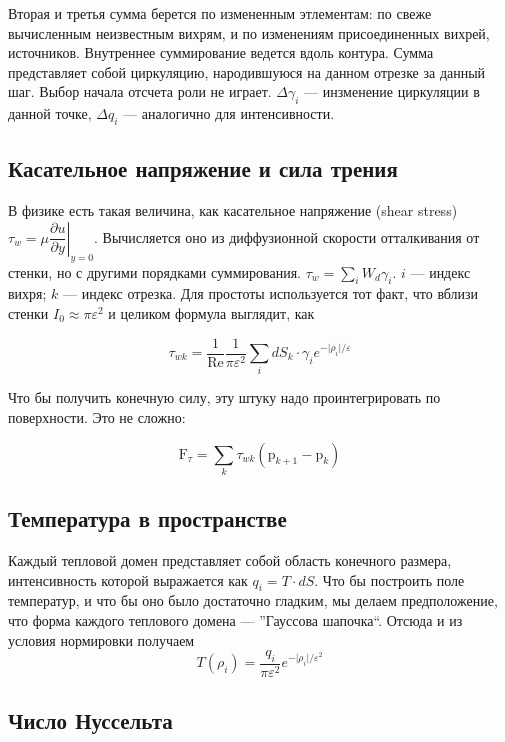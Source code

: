 \documentclass[14pt]{extreport}
\newcommand{\br}[1]{\boldsymbol{\mathrm{#1}}}
\newcommand{\Reyn}{\text{Re}}
\begin{document}
Вторая и третья сумма берется по измененным этлементам: по свеже 
вычисленным неизвестным вихрям, и по изменениям присоединенных вихрей, источников.
Внутреннее суммирование ведется вдоль контура. Сумма представляет собой циркуляцию,
народившуюся на данном отрезке за данный шаг. Выбор начала отсчета роли не играет.
$\Delta \gamma_i$ --- инзменение циркуляции в данной точке,
$\Delta q_i$ --- аналогично для интенсивности.

\subsection{Касательное напряжение и сила трения}

В физике есть такая величина, как касательное напряжение (shear stress) $\tau_w = \mu \left. \dfrac{\partial u}{\partial y} \right|_{y=0}$. Вычисляется оно из диффузионной скорости отталкивания от стенки, но с другими порядками суммирования. $ \tau_w = \sum_i {W_d \gamma_i}$. $i$ --- индекс вихря; $k$ --- индекс отрезка. Для простоты используется тот факт, что вблизи стенки $I_0 \approx \pi\varepsilon^2$ и целиком формула выглядит, как

$$ \tau_{wk} = \dfrac{1}{\Reyn}\dfrac{1}{\pi\varepsilon^2} \sum\limits_i dS_k\cdot \gamma_i e^{-\lvert\rho_i\rvert/\varepsilon}$$

Что бы получить конечную силу, эту штуку надо проинтегрировать по поверхности. Это не сложно:

$$ \br F_\tau = \sum_k {\tau_{wk} (\br p_{k+1} - \br p_k) } $$

\subsection{Температура в пространстве}
Каждый тепловой домен представляет собой область конечного размера, интенсивность которой выражается как $q_i = T \cdot dS$. Что бы построить поле температур, и что бы оно было достаточно гладким, мы делаем предположение, что форма каждого теплового домена --- ''Гауссова шапочка``. Отсюда и из условия нормировки получаем
$$T(\rho_i) = \dfrac{q_i}{\pi \varepsilon^2} e^{-\lvert \rho_i \rvert / \varepsilon^2}$$

\subsection{Число Нуссельта}
\end{document}
